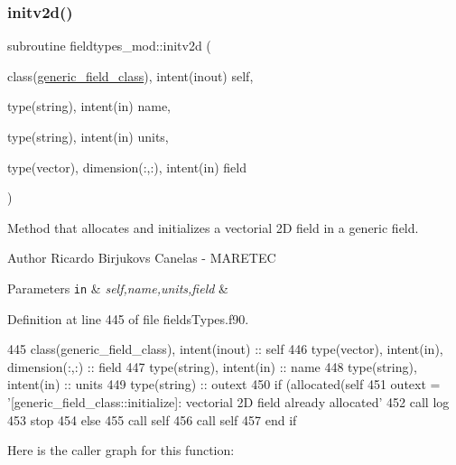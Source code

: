 \subsubsection{\texorpdfstring{initv2d()}{initv2d()}}
{\footnotesize\ttfamily subroutine fieldtypes\+\_\+mod\+::initv2d (\begin{DoxyParamCaption}\item[{class(\mbox{\hyperlink{structfieldtypes__mod_1_1generic__field__class}{generic\+\_\+field\+\_\+class}}), intent(inout)}]{self,  }\item[{type(string), intent(in)}]{name,  }\item[{type(string), intent(in)}]{units,  }\item[{type(vector), dimension(\+:,\+:), intent(in)}]{field }\end{DoxyParamCaption})\hspace{0.3cm}{\ttfamily [private]}}



Method that allocates and initializes a vectorial 2D field in a generic field. 

\begin{DoxyAuthor}{Author}
Ricardo Birjukovs Canelas -\/ M\+A\+R\+E\+T\+EC 
\end{DoxyAuthor}

\begin{DoxyParams}[1]{Parameters}
\mbox{\tt in}  & {\em self,name,units,field} & \\
\hline
\end{DoxyParams}


Definition at line 445 of file fields\+Types.\+f90.


\begin{DoxyCode}
445     \textcolor{keywordtype}{class}(generic\_field\_class), \textcolor{keywordtype}{intent(inout)} :: self
446     \textcolor{keywordtype}{type}(vector), \textcolor{keywordtype}{intent(in)}, \textcolor{keywordtype}{dimension(:,:)} :: field
447     \textcolor{keywordtype}{type}(string), \textcolor{keywordtype}{intent(in)} :: name
448     \textcolor{keywordtype}{type}(string), \textcolor{keywordtype}{intent(in)} :: units
449     \textcolor{keywordtype}{type}(string) :: outext
450     \textcolor{keywordflow}{if} (\textcolor{keyword}{allocated}(self%
451         outext = \textcolor{stringliteral}{'[generic\_field\_class::initialize]: vectorial 2D field already allocated'}
452         \textcolor{keyword}{call }log%
453         stop
454     \textcolor{keywordflow}{else}
455         \textcolor{keyword}{call }self%
456         \textcolor{keyword}{call }self%
457 \textcolor{keywordflow}{    end if}
\end{DoxyCode}
Here is the caller graph for this function\+:
\mbox{\label{namespacefieldtypes__mod_aa0a152c9e5131d3003cc34e4f3b2974d}} 
